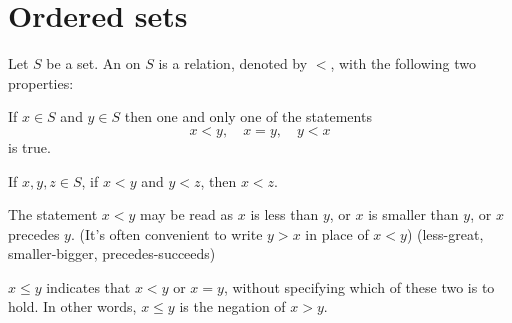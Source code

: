 \section{Ordered sets}

\begin{mydef}\label{mydef:1.5}
    Let $S$ be a set. 
    An  on $S$ is a relation, denoted by $<$,
    with the following two properties:
    \begin{asparaenum}[(i)]
        \item If $x\in S$ and $y\in S$ then one and only one of the statements
        \begin{equation*}
            x<y, \quad
            x=y, \quad
            y<x
        \end{equation*}
        is true.    
        \item If $x,y,z\in S$, if $x<y$ and $y<z$, then $x<z$.
    \end{asparaenum}

    The statement $x < y$ may be read as 
    $x$ is less than $y$, or 
    $x$ is smaller than $y$, or
    $x$ precedes $y$.
    (It's often convenient to write $y>x$ in place of $x<y$)
    (less-great, smaller-bigger, precedes-succeeds)


    $x\leq y$ indicates that $x<y$ or $x=y$, 
    without specifying which of these two is to hold.
    In other words, $x\leq y$ is the negation of $x>y$.
\end{mydef}



